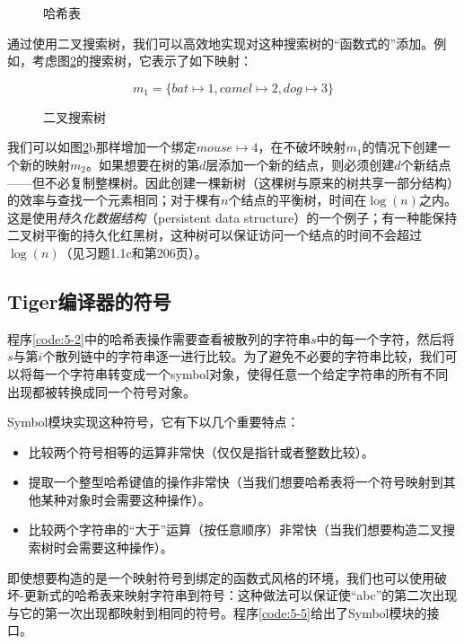 \documentclass[cn,11pt,chinese]{elegantbook}
\begin{document}
\begin{figure}[htbp]
  \centering
  
  \caption{哈希表}
  \label{fig:5-3}
\end{figure}

通过使用二叉搜索树，我们可以高效地实现对这种搜索树的“函数式的”添加。例如，考虑图\ref{fig:5-4}的搜索树，它表示了如下映射：

$$
m_1=\{bat\mapsto 1,camel\mapsto 2,dog\mapsto 3\}
$$

\begin{figure}[htbp]
  \centering
  
  \caption{二叉搜索树}
  \label{fig:5-4}
\end{figure}

我们可以如图\ref{fig:5-4}b那样增加一个绑定$mouse\mapsto 4$，在不破坏映射$m_1$的情况下创建一个新的映射$m_2$。如果想要在树的第$d$层添加一个新的结点，则必须创建$d$个新结点——但不必复制整棵树。因此创建一棵新树（这棵树与原来的树共享一部分结构）的效率与查找一个元素相同；对于棵有$n$个结点的平衡树，时间在$\log(n)$之内。这是使用\textit{持久化数据结构}（persistent data structure）的一个例子；有一种能保持二叉树平衡的持久化红黑树，这种树可以保证访问一个结点的时间不会超过$\log(n)$（见习题1.1c和第206页）。

\subsection{Tiger编译器的符号}

程序\ref{code:5-2}中的哈希表操作需要查看被散列的字符串$s$中的每一个字符，然后将$s$与第$i$个散列链中的字符串逐一进行比较。为了避免不必要的字符串比较，我们可以将每一个字符串转变成一个symbol对象，使得任意一个给定字符串的所有不同出现都被转换成同一个符号对象。

Symbol模块实现这种符号，它有下以几个重要特点：

\begin{itemize}
  \item 比较两个符号相等的运算非常快（仅仅是指针或者整数比较）。	
  \item 提取一个整型哈希键值的操作非常快（当我们想要哈希表将一个符号映射到其他某种对象时会需要这种操作）。
  \item 比较两个字符串的“大于”运算（按任意顺序）非常快（当我们想要构造二叉搜索树时会需要这种操作）。
\end{itemize}

即使想要构造的是一个映射符号到绑定的函数式风格的环境，我们也可以使用破坏-更新式的哈希表来映射字符串到符号：这种做法可以保证使“abc”的第二次出现与它的第一次出现都映射到相同的符号。程序\ref{code:5-5}给出了Symbol模块的接口。
\end{document}
